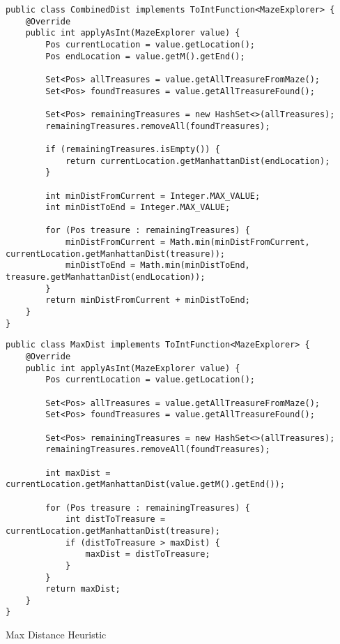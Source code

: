 \documentclass[12pt]{article}
\begin{document}
\label{list:combined}
\begin{verbatim}
public class CombinedDist implements ToIntFunction<MazeExplorer> {
    @Override
    public int applyAsInt(MazeExplorer value) {
        Pos currentLocation = value.getLocation();
        Pos endLocation = value.getM().getEnd();

        Set<Pos> allTreasures = value.getAllTreasureFromMaze();
        Set<Pos> foundTreasures = value.getAllTreasureFound();

        Set<Pos> remainingTreasures = new HashSet<>(allTreasures);
        remainingTreasures.removeAll(foundTreasures);

        if (remainingTreasures.isEmpty()) {
            return currentLocation.getManhattanDist(endLocation);
        }

        int minDistFromCurrent = Integer.MAX_VALUE;
        int minDistToEnd = Integer.MAX_VALUE;

        for (Pos treasure : remainingTreasures) {
            minDistFromCurrent = Math.min(minDistFromCurrent, currentLocation.getManhattanDist(treasure));
            minDistToEnd = Math.min(minDistToEnd, treasure.getManhattanDist(endLocation));
        }
        return minDistFromCurrent + minDistToEnd;
    }
}
\end{verbatim}
\vspace{2em}


\begin{listing}[h!]

\begin{verbatim}
public class MaxDist implements ToIntFunction<MazeExplorer> {
    @Override
    public int applyAsInt(MazeExplorer value) {
        Pos currentLocation = value.getLocation();

        Set<Pos> allTreasures = value.getAllTreasureFromMaze();
        Set<Pos> foundTreasures = value.getAllTreasureFound();

        Set<Pos> remainingTreasures = new HashSet<>(allTreasures);
        remainingTreasures.removeAll(foundTreasures);

        int maxDist = currentLocation.getManhattanDist(value.getM().getEnd());

        for (Pos treasure : remainingTreasures) {
            int distToTreasure = currentLocation.getManhattanDist(treasure);
            if (distToTreasure > maxDist) {
                maxDist = distToTreasure;
            }
        }
        return maxDist;
    }
}
\end{verbatim}
\caption{Max Distance Heuristic}\label{list:max}
\end{listing}
\end{document}
